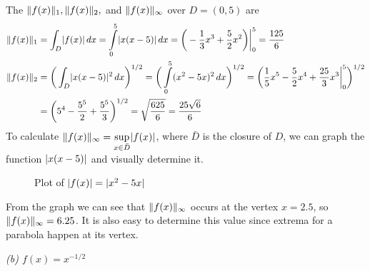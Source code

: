 \documentclass[12pt]{article}
\DeclarePairedDelimiter \abs{\lvert}{\rvert}%
\DeclarePairedDelimiter \norm{\lVert}{\rVert}%
\theoremstyle{remark}
\begin{document}
The $\norm{f(x)}_1, \norm{f(x)}_2,$ and $\norm{f(x)}_\infty$ over $D = (0,5)$ are
\begin{align*}
	\norm{f(x)}_1 & = \int_D \abs{f(x)} \, dx = \int\limits_0^5 \abs{x(x-5)} \,dx = \bigg(-\frac{1}{3}x^3 + \frac{5}{2}x^2\bigg)\bigg\vert_0^5 = \frac{125}{6} \\
	\norm{f(x)}_2 & = \bigg(\int_D \abs{x(x-5)}^2 \, dx\bigg)^{1/2} = \bigg(\int\limits_0^5 (x^2 - 5x)^2 \, dx\bigg)^{1/2} = \bigg(\frac{1}{5}x^5 - \frac{5}{2}x^4 +
	\frac{25}{3}x^3\bigg\vert_0^5\bigg)^{1/2} \\
	& = \bigg(5^4 - \frac{5^5}{2} + \frac{5^5}{3}\bigg)^{1/2} = \sqrt{\frac{625}{6}} = \frac{25\sqrt{6}}{6} \\
\end{align*}
To calculate $\norm{f(x)}_\infty = \sup\limits_{x \in \bar{D}} \abs{f(x)}$, where $\bar{D}$ is the closure of $D$, we can graph the function $\abs{x(x-5)}$ and visually determine it. 
\begin{figure}[H]
	\centering
	\caption{Plot of $\abs{f(x)} = \abs{x^2 - 5x}$}
\end{figure}
From the graph we can see that $\norm{f(x)}_\infty$ occurs at the vertex $x = 2.5$, so $\norm{f(x)}_\infty = 6.25$. It is also easy to determine this value since extrema for a parabola happen at its vertex. \\

\newpage

\textit{(b) $f(x) = x^{-1/2}$} \\ 
\end{document}
